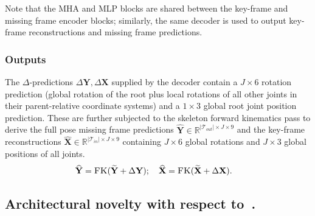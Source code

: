 \documentclass[letterpaper]{article} \usepackage[]{aaai23}  \usepackage{times}  \usepackage{helvet}  \usepackage{courier}  \usepackage[hyphens]{url}  \usepackage{graphicx} \urlstyle{rm} \def\UrlFont{\rm}  \usepackage{natbib}  \usepackage{caption} \frenchspacing  \setlength{\pdfpagewidth}{8.5in} \setlength{\pdfpageheight}{11in}
\renewcommand{\vec}[1]{\mathbf{#1}}
\DeclareMathOperator{\fk}{\textsc{FK}}
\begin{document}
Note that the MHA and MLP blocks are shared between the key-frame and missing frame encoder blocks; similarly, the same decoder is used to output key-frame reconstructions and missing frame predictions.

\subsubsection{Outputs} 
The $\Delta$-predictions $\Delta\vec{Y}, \Delta\vec{X}$ supplied by the decoder contain a $J \times 6$ rotation prediction (global rotation of the root plus local rotations of all other joints in their parent-relative coordinate systems) and a $1 \times 3$ global root joint position prediction. These are further subjected to the skeleton forward kinematics pass to derive the full pose missing frame predictions $\widehat{\vec{Y}} \in \mathbb{R}^{|\mathcal{T}_{out}| \times J \times 9}$ and the key-frame reconstructions $\widehat{\vec{X}} \in \mathbb{R}^{|\mathcal{T}_{in}| \times J \times 9}$ containing  $J \times 6$ global rotations and $J\times 3$ global positions of all joints.
\begin{align}
\widehat{\vec{Y}} &= \fk(\widetilde{\vec{Y}} + \Delta\vec{Y}); \quad \widehat{\vec{X}} = \fk(\widetilde{\vec{X}} + \Delta\vec{X}). \nonumber
\end{align}

\subsection{Architectural novelty with respect to~\cite{duan2021singleshot}.} \label{ssec:architectural_novelty}
\end{document}
